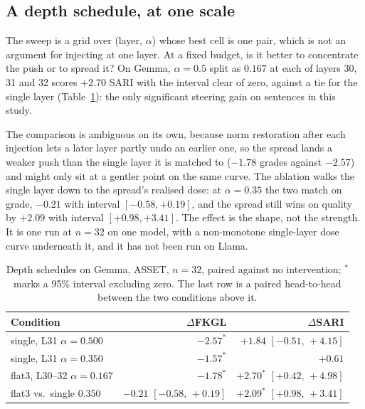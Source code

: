 \documentclass[aps,prb,reprint,nofootinbib,a4paper]{revtex4-2}
\begin{document}
\subsection{A depth schedule, at one scale}
\label{sec:sched}

The sweep is a grid over (layer, $\alpha$) whose best cell is one pair, which
is not an argument for injecting at one layer. At a fixed budget, is it better
to concentrate the push or to spread it? On Gemma, $\alpha=0.5$ split as
$0.167$ at each of layers 30, 31 and 32 scores $+2.70$ SARI with the interval
clear of zero, against a tie for the single layer (Table~\ref{tab:sched}): the
only significant steering gain on sentences in this study.

The comparison is ambiguous on its own, because norm restoration after each
injection lets a later layer partly undo an earlier one, so the spread lands a
weaker push than the single layer it is matched to ($-1.78$ grades against
$-2.57$) and might only sit at a gentler point on the same curve. The
ablation walks the single layer down to the spread's realised dose: at
$\alpha=0.35$ the two match on grade, $-0.21$ with interval $[-0.58, +0.19]$,
and the spread still wins on quality by $+2.09$ with interval $[+0.98,
+3.41]$. The effect is the shape, not the strength. It is one run at $n=32$ on
one model, with a non-monotone single-layer dose curve underneath it, and it
has not been run on Llama.

\begin{table}[t]
\centering
\caption{Depth schedules on Gemma, ASSET, $n=32$, paired against no
intervention; $^*$ marks a 95\% interval excluding zero. The last row is a
paired head-to-head between the two conditions above it.}
\setlength{\tabcolsep}{2pt}
\scriptsize
\begin{tabular}{@{}lrr@{}}
\toprule
Condition & $\Delta$FKGL & $\Delta$SARI \\
\midrule
single, L31 $\alpha{=}0.500$        & $-2.57^{*}$ & $+1.84$ $[-0.51,\,+4.15]$ \\
single, L31 $\alpha{=}0.350$        & $-1.57^{*}$ & $+0.61$ \\
flat3, L30--32 $\alpha{=}0.167$ & $-1.78^{*}$ & $+2.70^{*}$ $[+0.42,\,+4.98]$ \\
\midrule
flat3 vs.\ single $0.350$ & $-0.21$ $[-0.58,\,+0.19]$ & $+2.09^{*}$ $[+0.98,\,+3.41]$ \\
\bottomrule
\end{tabular}
\label{tab:sched}
\end{table}
\end{document}
